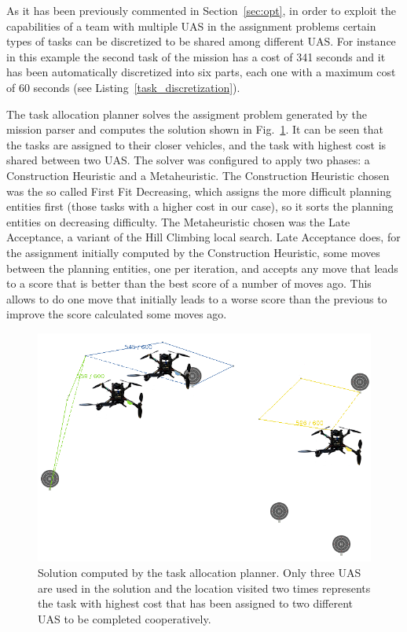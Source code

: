 \documentclass[twocolumn]{svjour3}          %
\begin{document}
As it has been previously commented in Section~\ref{sec:opt}, in order to exploit the capabilities of a team with multiple UAS in the assignment problems certain types of tasks can be discretized to be shared among different UAS. For instance in this example the second task of the mission has a cost of 341 seconds and it has been automatically discretized into six parts, each one with a maximum cost of 60 seconds (see Listing~\ref{task_discretization}). 

The task allocation planner solves the assigment problem generated by the mission parser and computes the solution shown in Fig.~\ref{fig:solution_optaplanner}.  It can be seen that the tasks are assigned to their closer vehicles, and the task with highest cost is shared between two UAS. The solver was configured to apply two phases: a Construction Heuristic and a Metaheuristic. The Construction Heuristic chosen was the so called First Fit Decreasing, which assigns the more difficult planning entities first (those tasks with a higher cost in our case), so it sorts the planning entities on decreasing difficulty. The Metaheuristic chosen was the Late Acceptance, a variant of the Hill Climbing local search. Late Acceptance does, for the assignment initially computed by the Construction Heuristic, some moves between the planning entities, one per iteration, and accepts any move that leads to a score that is better than the best score of a number of moves ago. This allows to do one move that initially leads to a worse score than the previous to improve the score calculated some moves ago. 



\begin{figure}
    \centering
    \includegraphics[width=1.0\columnwidth]{solucion.png}
    \caption[Solution computed by task allocation planner.]{Solution computed by the task allocation planner. Only three UAS are used in the solution and the location visited two times represents the task with highest cost that has been assigned to two different UAS to be completed cooperatively.}
    \label{fig:solution_optaplanner}
\end{figure}
\end{document}

